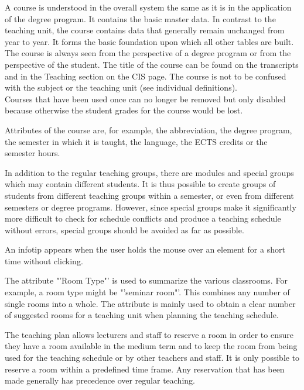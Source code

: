 {{	
A course is understood in the overall system the same as it is in the application of the degree program. It contains the basic master data. In contrast to the teaching unit, the course contains data that generally remain unchanged from year to year. It forms the basic foundation upon which all other tables are built.\\
The course is always seen from the perspective of a degree program or from the perspective of the student. The title of the course can be found on the transcripts and in the Teaching section on the CIS page. The course is not to be confused with the subject or the teaching unit (see individual definitions).\\
Courses that have been used once can no longer be removed but only disabled because otherwise the student grades for the course would be lost.

Attributes of the course are, for example, the abbreviation, the degree program, the semester in which it is taught, the language, the ECTS credits or the semester hours.

In addition to the regular teaching groups, there are modules and special groups which may contain different students.
It is thus possible to create groups of students from different teaching groups within a semester, or even from different semesters or degree programs. However, since special groups make it significantly more difficult to check for schedule conflicts and produce a teaching schedule without errors, special groups should be avoided as far as possible.

An infotip appears when the user holds the mouse over an element for a short time without clicking.

The attribute "'Room Type"' is used to summarize the various classrooms.
For example, a room type might be "'seminar room"'. This combines any number of single rooms into a whole.
The attribute is mainly used to obtain a clear number of suggested rooms for a teaching unit when planning the teaching schedule.

The teaching plan allows lecturers and staff to reserve a room in order to ensure they have a room available in the medium term and to keep the room from being used for the teaching schedule or by other teachers and staff.
It is only possible to reserve a room within a predefined time frame. Any reservation that has been made generally has precedence over regular teaching.

}}
